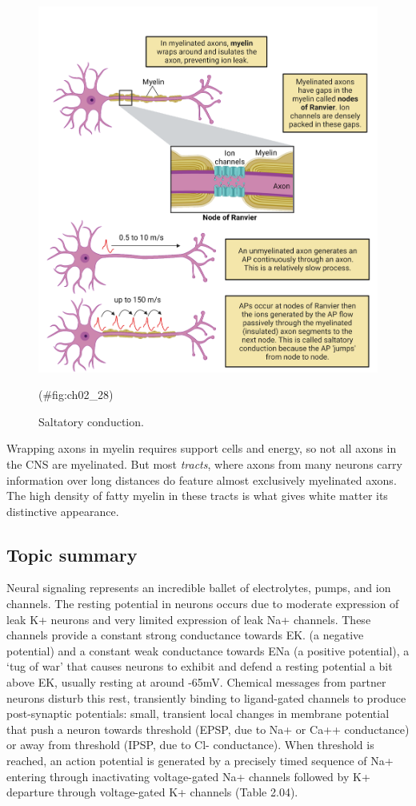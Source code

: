 \documentclass[
]{book}
\begin{document}
\begin{figure}

{\centering \includegraphics[width=0.8\linewidth]{images/ch02/02_27} 

}

\caption{Saltatory conduction.}(\#fig:ch02_28)
\end{figure}

Wrapping axons in myelin requires support cells and energy, so not all axons in the CNS are myelinated. But most \emph{tracts}, where axons from many neurons carry information over long distances do feature almost exclusively myelinated axons. The high density of fatty myelin in these tracts is what gives white matter its distinctive appearance.

\hypertarget{topic-summary-3}{%
\subsection{Topic summary}\label{topic-summary-3}}

Neural signaling represents an incredible ballet of electrolytes, pumps, and ion channels. The resting potential in neurons occurs due to moderate expression of leak K+ neurons and very limited expression of leak Na+ channels. These channels provide a constant strong conductance towards EK. (a negative potential) and a constant weak conductance towards ENa (a positive potential), a `tug of war' that causes neurons to exhibit and defend a resting potential a bit above EK, usually resting at around -65mV. Chemical messages from partner neurons disturb this rest, transiently binding to ligand-gated channels to produce post-synaptic potentials: small, transient local changes in membrane potential that push a neuron towards threshold (EPSP, due to Na+ or Ca++ conductance) or away from threshold (IPSP, due to Cl- conductance). When threshold is reached, an action potential is generated by a precisely timed sequence of Na+ entering through inactivating voltage-gated Na+ channels followed by K+ departure through voltage-gated K+ channels (Table 2.04).
\end{document}
